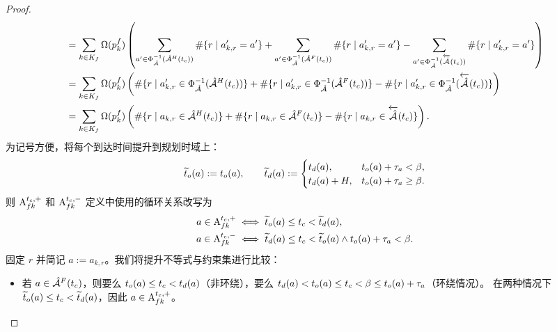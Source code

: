 \begin{proof}
\begin{equation*}
\begin{aligned}
    &=
    \sum_{k\in K_f}\routeAmount{\pathInRoute{f}{k}}
        \left(
            \sum_{a'\in\Phi_{\arcSet}^{-1}(\holdingArcTc{\checkTime})}\#\{r \mid a^{\prime}_{k,r}=a'\}
            +\sum_{a'\in\Phi_{\arcSet}^{-1}(\flightArcTc{\checkTime})}\#\{r \mid a^{\prime}_{k,r}=a'\}
            -\sum_{a'\in\Phi_{\arcSet}^{-1}(\invertArcTc{\checkTime})}\#\{r \mid a^{\prime}_{k,r}=a'\}
        \right)\\
    &=
    \sum_{k\in K_f}\routeAmount{\pathInRoute{f}{k}}
        \left(
            \#\{r \mid a^{\prime}_{k,r}\in\Phi_{\arcSet}^{-1}(\holdingArcTc{\checkTime})\}
            +\#\{r \mid a^{\prime}_{k,r}\in\Phi_{\arcSet}^{-1}(\flightArcTc{\checkTime})\}
            -\#\{r \mid a^{\prime}_{k,r}\in\Phi_{\arcSet}^{-1}(\invertArcTc{\checkTime})\}
        \right)\\
    &=
    \sum_{k\in K_f}
        \routeAmount{\pathInRoute{f}{k}}
        \left(
            \#\{r \mid a_{k,r}\in\holdingArcTc{\checkTime}\}
            + \#\{r \mid a_{k,r}\in\flightArcTc{\checkTime}\}
            - \#\{r \mid a_{k,r}\in\invertArcTc{\checkTime}\}
        \right).
\end{aligned}
\end{equation*}
为记号方便，将每个到达时间提升到规划时域上：
\[
    \widetilde{t}_o(a) := t_o(a),\qquad
    \widetilde{t}_d(a) :=
        \begin{cases}
            t_d(a),      & t_o(a)+\travelTime_a < \planningEnd,\\
            t_d(a)+H, & t_o(a)+\travelTime_a \ge \planningEnd.
        \end{cases}
\]
则 $\arcPosi$ 和 $\arcNega$ 定义中使用的循环关系改写为
\begin{equation*}
\begin{aligned}
    a\in\arcPosi
        &\iff \widetilde{t}_o(a) \le \checkTime < \widetilde{t}_d(a),\\
    a\in\arcNega
        &\iff \widetilde{t}_d(a) \le \checkTime < \widetilde{t}_o(a) \wedge t_o(a)+\travelTime_a < \planningEnd.
\end{aligned}
\end{equation*}
固定 $r$ 并简记 $a:=a_{k,r}$。我们将提升不等式与约束集进行比较：
\begin{itemize}
    \item 若 $a\in\flightArcTc{\checkTime}$，则要么
    $t_o(a)\le \checkTime < t_d(a)$（非环绕），要么
    $t_d(a)<t_o(a)\le \checkTime < \planningEnd \le t_o(a)+\travelTime_a$（环绕情况）。
    在两种情况下 $\widetilde{t}_o(a) \le \checkTime < \widetilde{t}_d(a)$，因此 $a\in\arcPosi$。

\end{itemize}
\end{proof}
